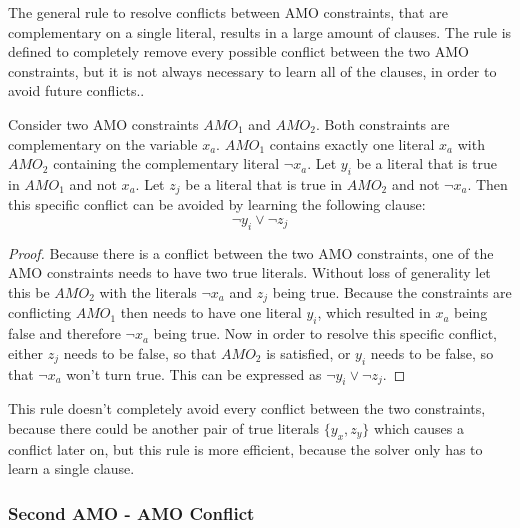 The general rule to resolve conflicts between AMO constraints, that are complementary on a single literal, results in a large amount of clauses. The rule is defined to completely remove every possible conflict between the two AMO constraints, but it is not always necessary to learn all of the clauses, in order to avoid future conflicts..

\begin{lemma}
\begin{leftbar}
Consider two AMO constraints $AMO_1$ and $AMO_2$. Both constraints are complementary on the variable $x_a$. $AMO_1$ contains exactly one literal $x_a$ with $AMO_2$ containing the complementary literal $\neg x_a$. Let $y_i$ be a literal that is true in $AMO_1$ and not $x_a$. Let $z_j$ be a literal that is true in $AMO_2$ and not $\neg x_a$. Then this specific conflict can be avoided by learning the following clause:
\begin{displaymath}
\neg y_i \vee \neg z_j
\end{displaymath}
\end{leftbar}
\end{lemma}

\begin{proof}
Because there is a conflict between the two AMO constraints, one of the AMO constraints needs to have two true literals. Without loss of generality let this be $AMO_2$ with the literals $\neg x_a$ and $z_j$ being true. Because the constraints are conflicting $AMO_1$ then needs to have one literal $y_i$, which resulted in $x_a$ being  false and therefore $\neg x_a$ being true. Now in order to resolve this specific conflict, either $z_j$ needs to be false, so that $AMO_2$ is satisfied, or $y_i$ needs to be false, so that $\neg x_a$ won't turn true. This can be expressed as $\neg y_i \vee \neg z_j$.
\end{proof}

This rule doesn't completely avoid every conflict between the two constraints, because there could be another pair of true literals $\{y_x,z_y\}$ which causes a conflict later on, but this rule is more efficient, because the solver only has to learn a single clause.

\subsubsection{Second AMO - AMO Conflict}

